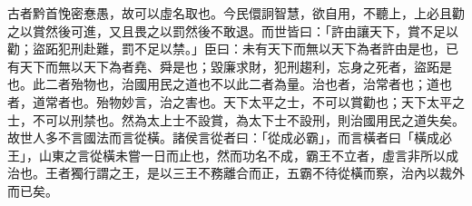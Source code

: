 \begin{pinyinscope}
古者黔首悗密惷愚，故可以虛名取也。今民儇詗智慧，欲自用，不聽上，上必且勸之以賞然後可進，又且畏之以罰然後不敢退。而世皆曰：「許由讓天下，賞不足以勸；盜跖犯刑赴難，罰不足以禁。」臣曰：未有天下而無以天下為者許由是也，已有天下而無以天下為者堯、舜是也；毀廉求財，犯刑趨利，忘身之死者，盜跖是也。此二者殆物也，治國用民之道也不以此二者為量。治也者，治常者也；道也者，道常者也。殆物妙言，治之害也。天下太平之士，不可以賞勸也；天下太平之士，不可以刑禁也。然為太上士不設賞，為太下士不設刑，則治國用民之道失矣。故世人多不言國法而言從橫。諸侯言從者曰：「從成必霸」，而言橫者曰「橫成必王」，山東之言從橫未嘗一日而止也，然而功名不成，霸王不立者，虛言非所以成治也。王者獨行謂之王，是以三王不務離合而正，五霸不待從橫而察，治內以裁外而已矣。


\end{pinyinscope}